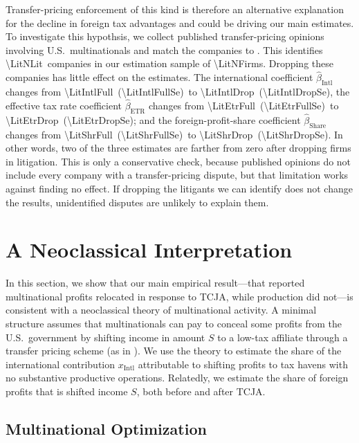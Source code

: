 \documentclass[11pt,letterpaper]{article}
\newcommand{\CountNum}[1]{\num[round-mode=places,round-precision=0]{#1}}
\newcommand{\CoefNum}[1]{\num[round-mode=places,round-precision=3]{#1}}
\newcommand{\SENum}[1]{(\num[round-mode=places,round-precision=3]{#1})}
\begin{document}
Transfer-pricing enforcement of this kind is therefore an alternative 
explanation for the decline in foreign tax advantages
and could be driving our main estimates. To investigate this
hypothsis, we collect published transfer-pricing opinions involving U.S.~multinationals 
and match the companies to \citet{CompustatAnnual}. This
identifies \CountNum{\LitNLit}\ companies in our estimation sample of
\CountNum{\LitNFirms}. Dropping these companies has little effect on the
estimates. 
The international coefficient $\hat\beta_{\text{Intl}}$  changes from
\CoefNum{\LitIntlFull}\ \SENum{\LitIntlFullSe}\ to
\CoefNum{\LitIntlDrop}\ \SENum{\LitIntlDropSe}, 
the effective tax rate coefficient
$\hat\beta_{\text{ETR}}$ changes from
\CoefNum{\LitEtrFull}\ \SENum{\LitEtrFullSe}\ to
\CoefNum{\LitEtrDrop}\ \SENum{\LitEtrDropSe}; and the foreign-profit-share coefficient
$\hat\beta_{\text{Share}}$ changes from
\CoefNum{\LitShrFull}\ \SENum{\LitShrFullSe}\ to
\CoefNum{\LitShrDrop}\ \SENum{\LitShrDropSe}. In other words,
two of the three estimates are farther from zero after dropping firms in litigation.
This is only a conservative check, because published opinions do not include
every company with a transfer-pricing dispute, but that limitation works against
finding no effect. If dropping the litigants we can identify does not change the
results, unidentified disputes are unlikely to explain them.


\section{A Neoclassical Interpretation\label{sec:Theory}}

In this section, we show that our main empirical result---that
reported multinational profits relocated  in response to TCJA,
while production did not---is consistent with a neoclassical theory
of multinational activity.
A minimal structure assumes that multinationals can pay to 
conceal some profits from the U.S.~government by shifting
income in amount $S$ to a low-tax affiliate through a transfer pricing scheme
(as in \citet{HinesRice1994}). We use the theory to estimate the
share of the international contribution $x_{\text{Intl}}$ 
attributable to shifting
profits to tax havens with no substantive productive operations.
Relatedly, we estimate the share of foreign profits that is
shifted income $S$, both before and after TCJA.

\subsection{Multinational Optimization}
\end{document}
